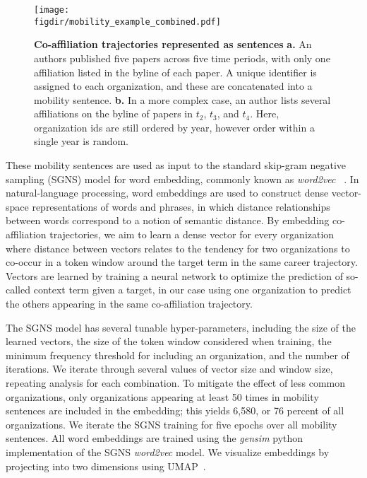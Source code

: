 \documentclass[12pt]{article} %
\def\figdir{../Figs}
\begin{document}
%
%
\begin{figure}[ht!]
	\centering
	\label{fig:methods:mobility_sentence}
	\texttt{[image: \\figdir/mobility\_example\_combined.pdf]}
	\caption{
		\textbf{Co-affiliation trajectories represented as sentences}
		\textbf{a.} 
		An authors published five papers across five time periods, with only one affiliation listed in the byline of each paper. 
		A unique identifier is assigned to each organization, and these are concatenated into a mobility sentence. 
		\textbf{b.}
		In a more complex case, an author lists several affiliations on the byline of papers in $t_{2}$, $t_{3}$, and $t_{4}$. Here, organization ids are still ordered by year, however order within a single year is random.  	
	}
\end{figure}

These mobility sentences are used as input to the standard skip-gram negative sampling (SGNS) model for word embedding, commonly known as \textit{word2vec}~\cite{mikolov2013word2vec} . 
In natural-language processing, word embeddings are used to construct dense vector-space representations of words and phrases, in which distance relationships between words correspond to a notion of semantic distance. 
By embedding co-affiliation trajectories, we aim to learn a dense vector for every organization where distance between vectors relates to the tendency for two organizations to co-occur in a token window around the target term in the same career trajectory. 
Vectors are learned by training a neural network to optimize the prediction of so-called context term given a target, in our case using one organization to predict the others appearing in the same co-affiliation trajectory. 

The SGNS model has several tunable hyper-parameters, including the size of the learned vectors, the size of the token window  considered when training, the minimum frequency threshold for including an organization, and the number of iterations.
We iterate through several values of vector size and window size, repeating analysis for each combination. 
To mitigate the effect of less common organizations, only organizations appearing at least 50 times in mobility sentences are included in the embedding;
this yields 6,580, or 76 percent of all organizations.
We iterate the SGNS training for five epochs over all mobility sentences. 
All word embeddings are trained using the \textit{gensim} python implementation of the SGNS \textit{word2vec} model. 
We visualize embeddings by projecting into two dimensions using UMAP~\cite{mcinnes2018umap}.
\end{document}
